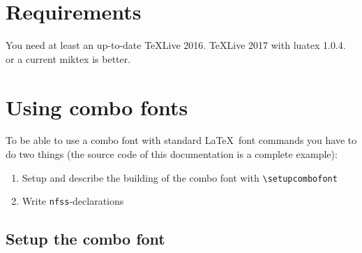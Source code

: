 \documentclass[parskip=half-]{scrartcl}
\begin{document}
\section{Requirements}
You need at least an up-to-date TeXLive 2016. TeXLive 2017 with luatex 1.0.4. or a current miktex is better.


\section{Using combo fonts}

To be able to use a combo font with standard \LaTeX\ font commands you have to do two things (the source code of this documentation is a complete example):

\begin{enumerate}
\item Setup and describe the building of the combo font with \verb+\setupcombofont+

\item Write \texttt{nfss}-declarations 
\end{enumerate}

\subsection{Setup the combo font}

\DescribeMacro{}
\end{document}
